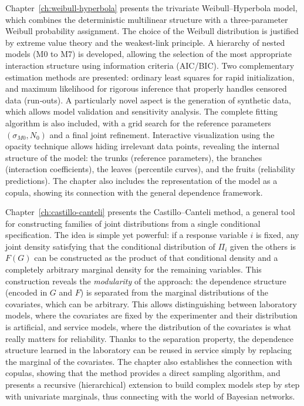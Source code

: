 Chapter~\ref{ch:weibull-hyperbola} presents the trivariate Weibull–Hyperbola model, which combines the deterministic multilinear structure with a three-parameter Weibull probability assignment. The choice of the Weibull distribution is justified by extreme value theory and the weakest-link principle. A hierarchy of nested models (M0 to M7) is developed, allowing the selection of the most appropriate interaction structure using information criteria (AIC/BIC). Two complementary estimation methods are presented: ordinary least squares for rapid initialization, and maximum likelihood for rigorous inference that properly handles censored data (run‑outs). A particularly novel aspect is the generation of synthetic data, which allows model validation and sensitivity analysis. The complete fitting algorithm is also included, with a grid search for the reference parameters $(\sigma_{M0}, N_0)$ and a final joint refinement. Interactive visualization using the opacity technique allows hiding irrelevant data points, revealing the internal structure of the model: the trunks (reference parameters), the branches (interaction coefficients), the leaves (percentile curves), and the fruits (reliability predictions). The chapter also includes the representation of the model as a copula, showing its connection with the general dependence framework.

Chapter~\ref{ch:castillo-canteli} presents the Castillo–Canteli method, a general tool for constructing families of joint distributions from a single conditional specification. The idea is simple yet powerful: if a response variable $i$ is fixed, any joint density satisfying that the conditional distribution of $\Pi_i$ given the others is $F(G)$ can be constructed as the product of that conditional density and a completely arbitrary marginal density for the remaining variables. This construction reveals the \emph{modularity} of the approach: the dependence structure (encoded in $G$ and $F$) is separated from the marginal distributions of the covariates, which can be arbitrary. This allows distinguishing between laboratory models, where the covariates are fixed by the experimenter and their distribution is artificial, and service models, where the distribution of the covariates is what really matters for reliability. Thanks to the separation property, the dependence structure learned in the laboratory can be reused in service simply by replacing the marginal of the covariates. The chapter also establishes the connection with copulas, showing that the method provides a direct sampling algorithm, and presents a recursive (hierarchical) extension to build complex models step by step with univariate marginals, thus connecting with the world of Bayesian networks.


